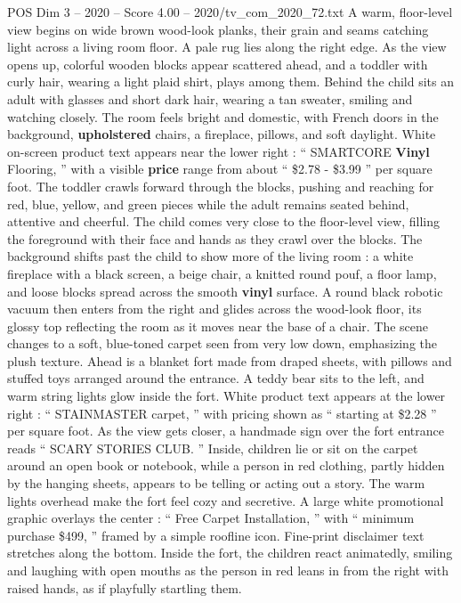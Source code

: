 \begin{textsample}{POS Dim 3 – 2020 – Score 4.00 – 2020/tv\_com\_2020\_72.txt}  \label{ex:f3_pos_076}
A warm, floor-level view begins on wide brown wood-look planks, their grain and seams catching light across a living room floor.
A pale rug lies along the right edge.
As the view opens up, colorful wooden blocks appear scattered ahead, and a toddler with curly hair, wearing a light plaid shirt, plays among them.
Behind the child sits an adult with glasses and short dark hair, wearing a tan sweater, smiling and watching closely.
The room feels bright and domestic, with French doors in the background, \textbf{upholstered} chairs, a fireplace, pillows, and soft daylight.
White on-screen product text appears near the lower right : “ SMARTCORE \textbf{Vinyl} Flooring, ” with a visible \textbf{price} range from about “ \$2.78 - \$3.99 ” per square foot.
The toddler crawls forward through the blocks, pushing and reaching for red, blue, yellow, and green pieces while the adult remains seated behind, attentive and cheerful.
The child comes very close to the floor-level view, filling the foreground with their face and hands as they crawl over the blocks.
The background shifts past the child to show more of the living room : a white fireplace with a black screen, a beige chair, a knitted round pouf, a floor lamp, and loose blocks spread across the smooth \textbf{vinyl} surface.
A round black robotic vacuum then enters from the right and glides across the wood-look floor, its glossy top reflecting the room as it moves near the base of a chair.
The scene changes to a soft, blue-toned carpet seen from very low down, emphasizing the plush texture.
Ahead is a blanket fort made from draped sheets, with pillows and stuffed toys arranged around the entrance.
A teddy bear sits to the left, and warm string lights glow inside the fort.
White product text appears at the lower right : “ STAINMASTER carpet, ” with pricing shown as “ starting at \$2.28 ” per square foot.
As the view gets closer, a handmade sign over the fort entrance reads “ SCARY STORIES CLUB. ” Inside, children lie or sit on the carpet around an open book or notebook, while a person in red clothing, partly hidden by the hanging sheets, appears to be telling or acting out a story.
The warm lights overhead make the fort feel cozy and secretive.
A large white promotional graphic overlays the center : “ Free Carpet Installation, ” with “ minimum purchase \$499, ” framed by a simple roofline icon.
Fine-print disclaimer text stretches along the bottom.
Inside the fort, the children react animatedly, smiling and laughing with open mouths as the person in red leans in from the right with raised hands, as if playfully startling them.

\end{textsample}
